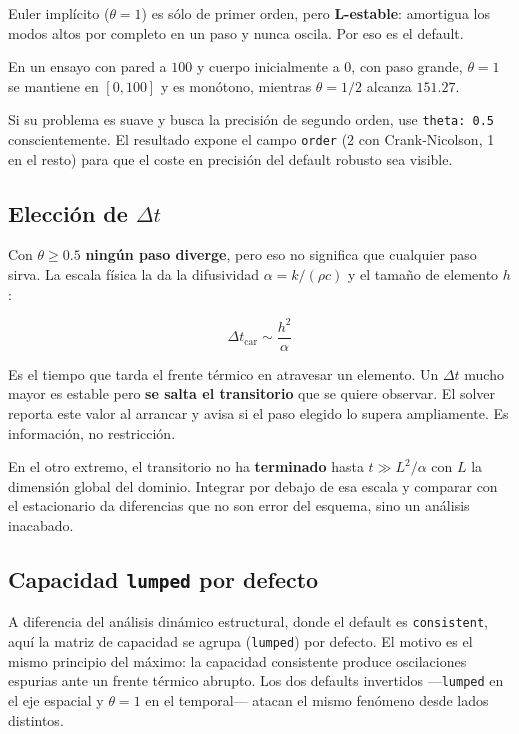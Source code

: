 \documentclass[11pt,oneside]{report}
\begin{document}
Euler implícito ($\theta = 1$) es sólo de primer orden, pero \textbf{L-estable}: amortigua los modos altos por completo en un paso y nunca oscila. Por eso es el default.

En un ensayo con pared a $100$ y cuerpo inicialmente a $0$, con paso grande, $\theta = 1$ se mantiene en $[0, 100]$ y es monótono, mientras $\theta = 1/2$ alcanza $151.27$.

Si su problema es suave y busca la precisión de segundo orden, use \texttt{theta: 0.5} conscientemente. El resultado expone el campo \texttt{order} (2 con Crank-Nicolson, 1 en el resto) para que el coste en precisión del default robusto sea visible.

\subsection{Elección de $\Delta t$}

Con $\theta \ge 0.5$ \textbf{ningún paso diverge}, pero eso no significa que cualquier paso sirva. La escala física la da la difusividad $\alpha = k/(\rho c)$ y el tamaño de elemento $h$:

\[
\Delta t_{\text{car}} \sim \frac{h^2}{\alpha}
\]

Es el tiempo que tarda el frente térmico en atravesar un elemento. Un $\Delta t$ mucho mayor es estable pero \textbf{se salta el transitorio} que se quiere observar. El solver reporta este valor al arrancar y avisa si el paso elegido lo supera ampliamente. Es información, no restricción.

En el otro extremo, el transitorio no ha \textbf{terminado} hasta $t \gg L^2/\alpha$ con $L$ la dimensión global del dominio. Integrar por debajo de esa escala y comparar con el estacionario da diferencias que no son error del esquema, sino un análisis inacabado.

\subsection{Capacidad \texttt{lumped} por defecto}

A diferencia del análisis dinámico estructural, donde el default es \texttt{consistent}, aquí la matriz de capacidad se agrupa (\texttt{lumped}) por defecto. El motivo es el mismo principio del máximo: la capacidad consistente produce oscilaciones espurias ante un frente térmico abrupto. Los dos defaults invertidos ---\texttt{lumped} en el eje espacial y $\theta = 1$ en el temporal--- atacan el mismo fenómeno desde lados distintos.
\end{document}
